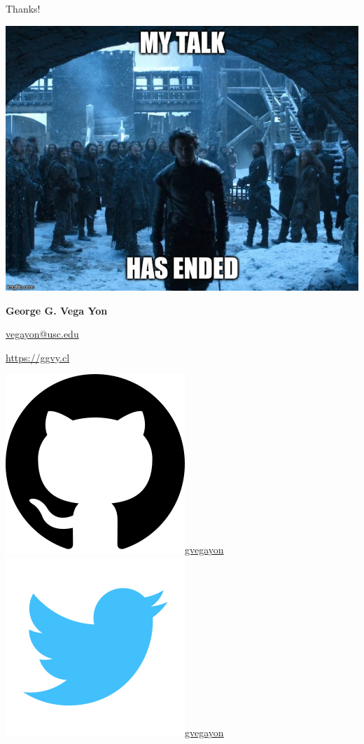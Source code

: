 \documentclass[10pt,ignorenonframetext,aspectratio=169,]{beamer}
\begin{document}
\begin{frame}{Thanks!}
\protect\hypertarget{thanks}{}

\begin{centering}
\includegraphics[width = .4\linewidth]{fig/the-end.jpg}

\large \textbf{\textcolor{USCCardinal}{George G. Vega Yon}}


\href{mailto:vegayon@usc.edu}{vegayon@usc.edu} 

\href{https://ggvy.cl}{https://ggvy.cl} 

\includegraphics[width=.02\linewidth]{github.png}\href{https://github.com/gvegayon}{gvegayon}
\includegraphics[width=.02\linewidth]{twitter.png}\href{https://twitter.com/gvegayon}{gvegayon}

\end{centering}

\end{frame}

\begin{frame}

\appendix

\end{frame}
\end{document}
